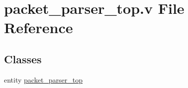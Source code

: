 \hypertarget{packet__parser__top_8v}{}\section{packet\+\_\+parser\+\_\+top.\+v File Reference}
\label{packet__parser__top_8v}
\subsection*{Classes}
\begin{DoxyCompactItemize}
\item 
entity \mbox{\hyperlink{enumpacket__parser__top}{packet\+\_\+parser\+\_\+top}}
\end{DoxyCompactItemize}

